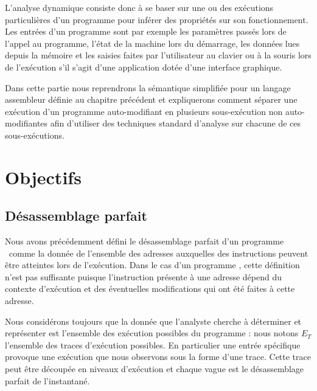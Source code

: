 

L'analyse dynamique consiste donc à se baser sur une ou des exécutions particulières d'un programme pour inférer des propriétés sur son fonctionnement.
Les entrées d'un programme sont par exemple les paramètres passés lors de l'appel au programme, l'état de la machine lors du démarrage, les données lues depuis la mémoire et les saisies faites par l'utilisateur au clavier ou à la souris lors de l'exécution s'il s'agit d'une application dotée d'une interface graphique.

Dans cette partie nous reprendrons la sémantique simplifiée pour un langage assembleur définie au chapitre précédent et expliquerons comment séparer une exécution d'un programme auto-modifiant en plusieurs sous-exécution non auto-modifiantes afin d'utiliser des techniques standard d'analyse sur chacune de ces sous-exécutions.

\section{Objectifs}
\subsection{Désassemblage parfait}
Nous avons précédemment défini le désassemblage parfait d'un programme \nsm\ comme la donnée de l'ensemble des adresses auxquelles des instructions peuvent être atteintes lors de l'exécution.
Dans le cas d'un programme \sm, cette définition n'est pas suffisante puisque l'instruction présente à une adresse dépend du contexte d'exécution et des éventuelles modifications qui ont été faites à cette adresse.

Nous considérons toujours que la donnée que l'analyste cherche à
déterminer et représenter est l'ensemble des exécution possibles du
programme : nous notons $E_T$ l'ensemble des traces d'exécution possibles.
En particulier une entrée spécifique provoque une exécution que nous observons sous la forme d'une trace.
Cette trace peut être découpée en niveaux d'exécution et chaque vague est le désassemblage parfait de l'instantané.

